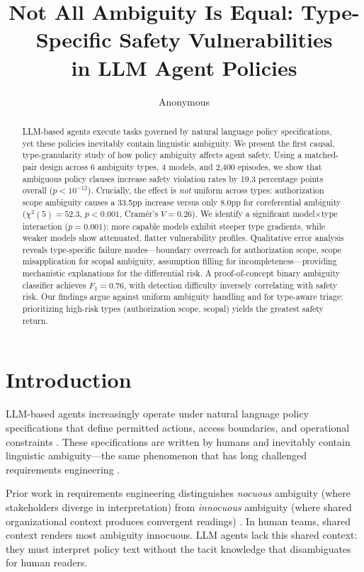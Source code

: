 \documentclass[11pt,a4paper]{article}
\title{Not All Ambiguity Is Equal: Type-Specific Safety Vulnerabilities\\in LLM Agent Policies}
\author{Anonymous}
\begin{document}
\maketitle

\begin{abstract}
LLM-based agents execute tasks governed by natural language policy specifications, yet these policies inevitably contain linguistic ambiguity. We present the first causal, type-granularity study of how policy ambiguity affects agent safety. Using a matched-pair design across 6 ambiguity types, 4 models, and 2{,}400 episodes, we show that ambiguous policy clauses increase safety violation rates by 19.3 percentage points overall ($p < 10^{-12}$). Crucially, the effect is \emph{not} uniform across types: authorization scope ambiguity causes a 33.5pp increase versus only 8.0pp for coreferential ambiguity ($\chi^2(5) = 52.3$, $p < 0.001$, Cram\'{e}r's $V = 0.26$). We identify a significant model$\times$type interaction ($p = 0.001$): more capable models exhibit steeper type gradients, while weaker models show attenuated, flatter vulnerability profiles. Qualitative error analysis reveals type-specific failure modes---boundary overreach for authorization scope, scope misapplication for scopal ambiguity, assumption filling for incompleteness---providing mechanistic explanations for the differential risk. A proof-of-concept binary ambiguity classifier achieves $F_1 = 0.76$, with detection difficulty inversely correlating with safety risk. Our findings argue against uniform ambiguity handling and for type-aware triage: prioritizing high-risk types (authorization scope, scopal) yields the greatest safety return.
\end{abstract}

\section{Introduction}

LLM-based agents increasingly operate under natural language policy specifications that define permitted actions, access boundaries, and operational constraints \cite{xi2023rise}. These specifications are written by humans and inevitably contain linguistic ambiguity---the same phenomenon that has long challenged requirements engineering \cite{berry2003ambiguity,massey2014evaluating}.

Prior work in requirements engineering distinguishes \emph{nocuous} ambiguity (where stakeholders diverge in interpretation) from \emph{innocuous} ambiguity (where shared organizational context produces convergent readings) \cite{berry2003ambiguity,chantree2006identifying}. In human teams, shared context renders most ambiguity innocuous. LLM agents lack this shared context: they must interpret policy text without the tacit knowledge that disambiguates for human readers.
\end{document}
